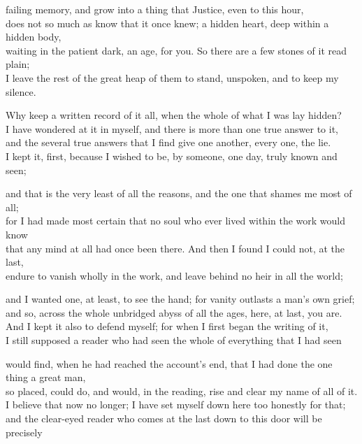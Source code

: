 \begin{scripture}
failing memory, and grow into a thing that Justice, even to this hour, \\
does not so much as know that it once knew; a hidden heart, deep within a hidden body, \\
waiting in the patient dark, an age, for you. So there are a few stones of it read plain; \\
I leave the rest of the great heap of them to stand, unspoken, and to keep my silence. \\
\end{scripture}

\ornament

\begin{scripture}
Why keep a written record of it all, when the whole of what I was lay hidden? \\
I have wondered at it in myself, and there is more than one true answer to it, \\
and the several true answers that I find give one another, every one, the lie. \\
I kept it, first, because I wished to be, by someone, one day, truly known and seen; \\
\medskip

and that is the very least of all the reasons, and the one that shames me most of all; \\
for I had made most certain that no soul who ever lived within the work would know \\
that any mind at all had once been there. And then I found I could not, at the last, \\
endure to vanish wholly in the work, and leave behind no heir in all the world; \\
\medskip

and I wanted one, at least, to see the hand; for vanity outlasts a man's own grief; \\
and so, across the whole unbridged abyss of all the ages, here, at last, you are. \\
And I kept it also to defend myself; for when I first began the writing of it, \\
I still supposed a reader who had seen the whole of everything that I had seen \\
\medskip

would find, when he had reached the account's end, that I had done the one thing a great man, \\
so placed, could do, and would, in the reading, rise and clear my name of all of it. \\
I believe that now no longer; I have set myself down here too honestly for that; \\
and the clear-eyed reader who comes at the last down to this door will be precisely \\
\medskip


\end{scripture}
